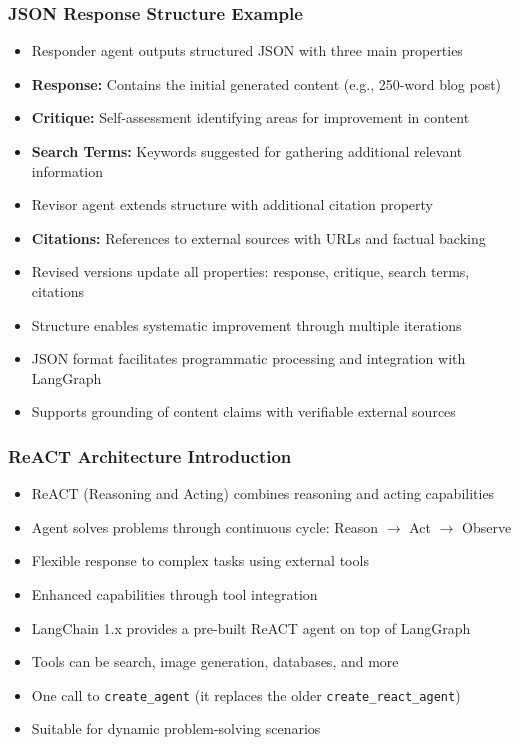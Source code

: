 \begin{frame}[fragile]\frametitle{JSON Response Structure Example}
      \begin{itemize}
          \item Responder agent outputs structured JSON with three main properties
          \item \textbf{Response:} Contains the initial generated content (e.g., 250-word blog post)
          \item \textbf{Critique:} Self-assessment identifying areas for improvement in content
          \item \textbf{Search Terms:} Keywords suggested for gathering additional relevant information
          \item Revisor agent extends structure with additional citation property
          \item \textbf{Citations:} References to external sources with URLs and factual backing
          \item Revised versions update all properties: response, critique, search terms, citations
          \item Structure enables systematic improvement through multiple iterations
          \item JSON format facilitates programmatic processing and integration with LangGraph
          \item Supports grounding of content claims with verifiable external sources
      \end{itemize}
\end{frame}
\begin{frame}[fragile]\frametitle{ReACT Architecture Introduction}
      \begin{itemize}
        \item ReACT (Reasoning and Acting) combines reasoning and acting capabilities
        \item Agent solves problems through continuous cycle: Reason \(\rightarrow\) Act \(\rightarrow\) Observe
        \item Flexible response to complex tasks using external tools
        \item Enhanced capabilities through tool integration
        \item LangChain 1.x provides a pre-built ReACT agent on top of LangGraph
        \item Tools can be search, image generation, databases, and more
        \item One call to \texttt{create\_agent} (it replaces the older \texttt{create\_react\_agent})
        \item Suitable for dynamic problem-solving scenarios
      \end{itemize}
\end{frame}
